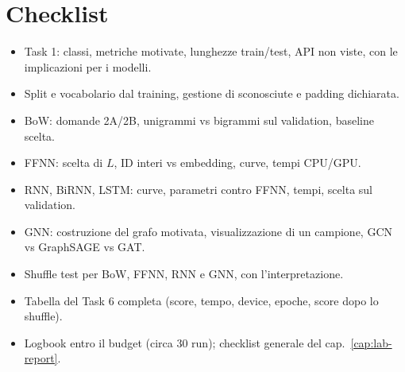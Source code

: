 \section{Checklist}
\begin{itemize}
  \item[$\square$] Task 1: classi, metriche motivate, lunghezze train/test, API non viste, con le
        implicazioni per i modelli.
  \item[$\square$] Split e vocabolario dal training, gestione di sconosciute e padding dichiarata.
  \item[$\square$] BoW: domande 2A/2B, unigrammi vs bigrammi sul validation, baseline scelta.
  \item[$\square$] FFNN: scelta di $L$, ID interi vs embedding, curve, tempi CPU/GPU.
  \item[$\square$] RNN, BiRNN, LSTM: curve, parametri contro FFNN, tempi, scelta sul validation.
  \item[$\square$] GNN: costruzione del grafo motivata, visualizzazione di un campione, GCN vs
        GraphSAGE vs GAT.
  \item[$\square$] Shuffle test per BoW, FFNN, RNN e GNN, con l'interpretazione.
  \item[$\square$] Tabella del Task 6 completa (score, tempo, device, epoche, score dopo lo shuffle).
  \item[$\square$] Logbook entro il budget (circa 30 run); checklist generale del cap.~\ref{cap:lab-report}.
\end{itemize}
